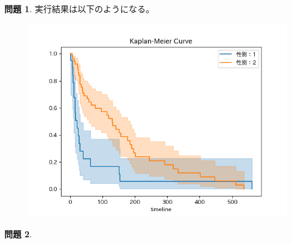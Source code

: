 \documentclass[titlepage]{jsarticle}
\theoremstyle{definition}
\newtheorem{Ex}{問題}
\theoremstyle{mystyle} %
\begin{document}
\begin{Ex}
実行結果は以下のようになる。
\begin{figure}[H]
 \centering
 \includegraphics[keepaspectratio, scale=0.7]{seizonnkaiseki.png}
\end{figure}
\end{Ex}
\begin{Ex}

\end{Ex}
\end{document}
